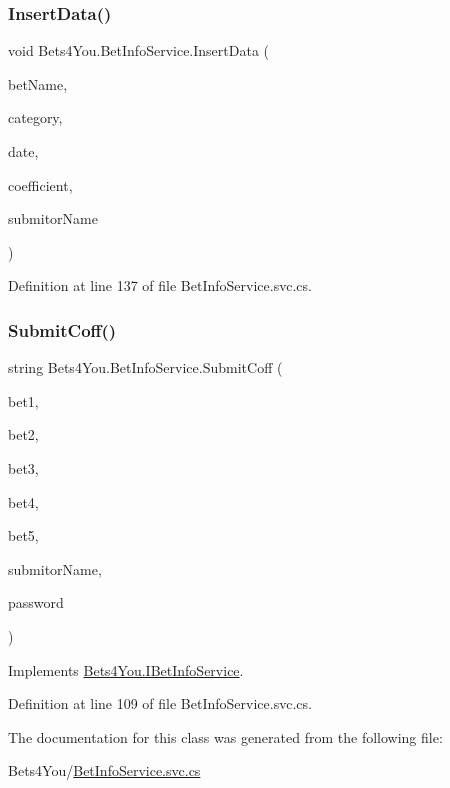 \subsubsection{\texorpdfstring{InsertData()}{InsertData()}}
{\footnotesize\ttfamily void Bets4\+You.\+Bet\+Info\+Service.\+Insert\+Data (\begin{DoxyParamCaption}\item[{string}]{bet\+Name,  }\item[{string}]{category,  }\item[{Date\+Time}]{date,  }\item[{int}]{coefficient,  }\item[{string}]{submitor\+Name }\end{DoxyParamCaption})}



Definition at line 137 of file Bet\+Info\+Service.\+svc.\+cs.

\mbox{\label{class_bets4_you_1_1_bet_info_service_a743f5c2955670ff7965a5bebce053be9}} 
\subsubsection{\texorpdfstring{SubmitCoff()}{SubmitCoff()}}
{\footnotesize\ttfamily string Bets4\+You.\+Bet\+Info\+Service.\+Submit\+Coff (\begin{DoxyParamCaption}\item[{int}]{bet1,  }\item[{int}]{bet2,  }\item[{int}]{bet3,  }\item[{int}]{bet4,  }\item[{int}]{bet5,  }\item[{string}]{submitor\+Name,  }\item[{string}]{password }\end{DoxyParamCaption})}



Implements \mbox{\hyperlink{interface_bets4_you_1_1_i_bet_info_service_a7f2edf98f56407ad890acfb5c4b839e3}{Bets4\+You.\+I\+Bet\+Info\+Service}}.



Definition at line 109 of file Bet\+Info\+Service.\+svc.\+cs.



The documentation for this class was generated from the following file\+:\begin{DoxyCompactItemize}
\item 
Bets4\+You/\mbox{\hyperlink{_bet_info_service_8svc_8cs}{Bet\+Info\+Service.\+svc.\+cs}}\end{DoxyCompactItemize}
